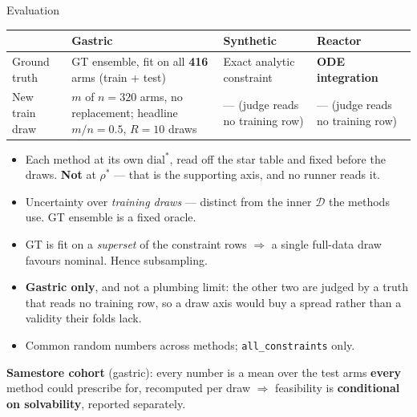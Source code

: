 \documentclass{beamer}
\begin{document}
\begin{frame}{Evaluation}
  \small
  \begin{center}
  \begin{tabular}{@{}>{\raggedright\arraybackslash}p{1.8cm}>{\raggedright\arraybackslash}p{3.0cm}>{\raggedright\arraybackslash}p{2.6cm}>{\raggedright\arraybackslash}p{2.4cm}@{}}
    \toprule
    & Gastric & Synthetic & Reactor \\
    \midrule
    Ground truth & GT ensemble, fit on all \textbf{416} arms (train + test)
      & Exact analytic constraint & \textbf{ODE integration} \\
    New train draw & $m$ of $n=320$ arms, no replacement; headline $m/n=0.5$,
      $R=10$ draws & --- (judge reads no training row) & --- (judge reads no
      training row) \\
    \bottomrule
  \end{tabular}
  \end{center}
  \begin{itemize}
    \item Each method at its own $\text{dial}^\ast$, read off the star table and
      fixed before the draws. \textbf{Not} at $\rho^\ast$ --- that is the
      supporting axis, and no runner reads it.
    \item Uncertainty over \emph{training draws} --- distinct from the inner
      $\mathcal D$ the methods use. GT ensemble is a fixed oracle.
    \item GT is fit on a \emph{superset} of the constraint rows $\Rightarrow$ a
      single full-data draw favours nominal. Hence subsampling.
    \item \textbf{Gastric only}, and not a plumbing limit: the other two are
      judged by a truth that reads no training row, so a draw axis would buy a
      spread rather than a validity their folds lack.
    \item Common random numbers across methods; \texttt{all\_constraints} only.
  \end{itemize}
  \footnotesize
  \textbf{Samestore cohort} (gastric): every number is a mean over the test arms
  \textbf{every} method could prescribe for, recomputed per draw $\Rightarrow$
  feasibility is \textbf{conditional on solvability}, reported separately.
\end{frame}
\end{document}
